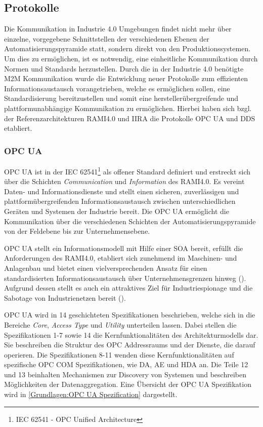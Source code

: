\subsection{Protokolle}
Die Kommunikation in Industrie 4.0 Umgebungen findet nicht mehr über einzelne, vorgegebene Schnittstellen der verschiedenen Ebenen der Automatisierungspyramide statt, sondern direkt von den Produktionssystemen. Um dies zu ermöglichen, ist es notwendig, eine einheitliche Kommunikation durch Normen und Standards herzustellen. Durch die in der Industrie 4.0 benötigte \ac{M2M} Kommunikation wurde die Entwicklung neuer Protokolle zum effizienten Informationsaustausch vorangetrieben, welche es ermöglichen sollen, eine Standardisierung bereitzustellen und somit eine herstellerübergreifende und plattformunabhängige Kommunikation zu ermöglichen. Hierbei haben sich bzgl. der Referenzarchitekturen \ac{RAMI4.0} und \ac{IIRA} die Protokolle \ac{OPC UA} und \ac{DDS} etabliert.

\subsubsection{\ac{OPC UA}}
\ac{OPC UA} ist in der \ac{IEC} 62541\footnote{IEC 62541 - OPC Unified Architecture} als offener Standard definiert und erstreckt sich über die Schichten \textit{Communication} und \textit{Information} des \ac{RAMI4.0}. Es vereint Daten- und Informationsdienste und stellt einen sicheren, zuverlässigen und plattformübergreifenden Informationsaustausch zwischen unterschiedlichen Geräten und Systemen der Industrie bereit. Die \ac{OPC UA} ermöglicht die Kommunikation über die verschiedenen Schichten der Automatisierungspyramide von der Feldebene bis zur Unternehmensebene. 

\ac{OPC UA} stellt ein Informationsmodell mit Hilfe einer \ac{SOA} bereit, erfüllt die Anforderungen des \ac{RAMI4.0}, etabliert sich zunehmend im Maschinen- und Anlagenbau und bietet einen vielversprechenden Ansatz für einen standardisierten Informationsaustausch über Unternehmensgrenzen hinweg (\cite{OPCWegbereiter2014}). Aufgrund dessen stellt es auch ein attraktives Ziel für Industriespionage und die Sabotage von Industrienetzen bereit (\cite{opcpt2}).

\ac{OPC UA} wird in 14 geschichteten Spezifikationen beschrieben, welche sich in die Bereiche \textit{Core}, \textit{Access Type} und \textit{Utility} unterteilen lassen. Dabei stellen die Spezifikationen 1-7 sowie 14 die Kernfunktionalitäten des Architekturmodells dar. Sie beschreiben die Struktur des OPC Addressraums und der Dienste, die darauf operieren. Die Spezifikationen 8-11 wenden diese Kernfunktionalitäten auf spezifische \ac{OPC COM} Spezifikationen, wie \ac{DA}, \ac{AE} und \ac{HDA} an. Die Teile 12 und 13 beinhalten Mechanismen zur Discovery von Systemen und beschreiben Möglichkeiten der Datenaggregation. Eine Übersicht der \ac{OPC UA} Spezifikation wird in \autoref{Grundlagen:OPC UA Spezification} dargestellt.


